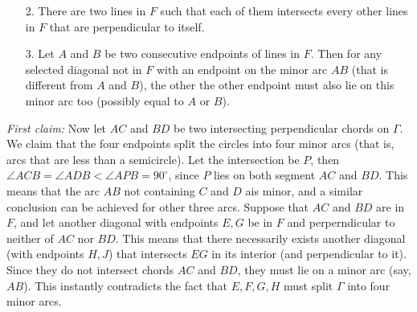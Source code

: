 \documentclass[11pt,a4paper]{article}
\begin{document}
\begin{itemize}
\begin{itemize}
\item [2.]
There are two lines in $F$ such that each of them intersects every other lines in $F$ that are perpendicular to itself.

\item [3.]
Let $A$ and $B$ be two consecutive endpoints of lines in $F$. 
Then for any selected diagonal not in $F$ with an endpoint on the minor arc $AB$ (that is different from $A$ and $B$), the other the other endpoint must also lie on this minor arc too (possibly equal to $A$ or $B$).

\end{itemize}
\emph{First claim:}
Now let $AC$ and $BD$ be two intersecting perpendicular chords on $\Gamma$. We claim that the four endpoints split the circles into four minor arcs (that is, arcs that are less than a semicircle). 
Let the intersection be $P$, then $\angle ACB=\angle ADB<\angle APB=90^{\circ}$, since $P$ lies on both segment $AC$ and $BD$. 
This means that the arc $AB$ not containing $C$ and $D$ ais minor, and a similar conclusion can be achieved for other three arcs. 
Suppose that $AC$ and $BD$ are in $F$, and let another diagonal with endpoints $E, G$ be in $F$ and perperndicular to neither of $AC$ nor $BD$. 
This means that there necessarily exists another diagonal (with endpoints $H, J$) that intersects $EG$ in its interior (and perpendicular to it). 
Since they do not intersect chords $AC$ and $BD$, they must lie on a minor arc (say, $AB$). 
This instantly contradicts the fact that $E, F, G, H$ must split $\Gamma$ into four minor arcs. 


\end{itemize}
\end{document}

